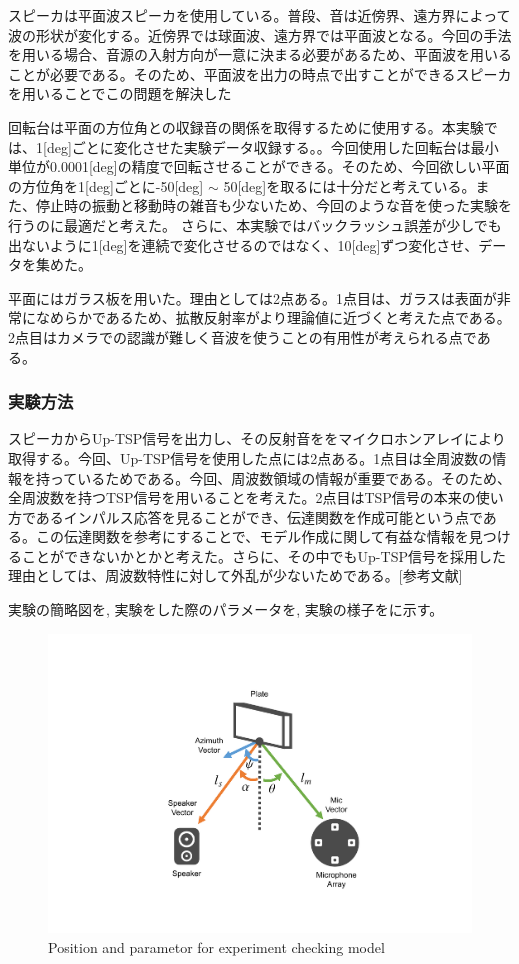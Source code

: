 スピーカは平面波スピーカを使用している。普段、音は近傍界、遠方界によって波の形状が変化する。近傍界では球面波、遠方界では平面波となる。今回の手法を用いる場合、音源の入射方向が一意に決まる必要があるため、平面波を用いることが必要である。そのため、平面波を出力の時点で出すことができるスピーカを用いることでこの問題を解決した

回転台は平面の方位角との収録音の関係を取得するために使用する。本実験では、1[deg]ごとに変化させた実験データ収録する。。今回使用した回転台は最小単位が0.0001[deg]の精度で回転させることができる。そのため、今回欲しい平面の方位角を1[deg]ごとに-50[deg] $\sim$ 50[deg]を取るには十分だと考えている。また、停止時の振動と移動時の雑音も少ないため、今回のような音を使った実験を行うのに最適だと考えた。
さらに、本実験ではバックラッシュ誤差が少しでも出ないように1[deg]を連続で変化させるのではなく、10[deg]ずつ変化させ、データを集めた。

平面にはガラス板を用いた。理由としては2点ある。1点目は、ガラスは表面が非常になめらかであるため、拡散反射率がより理論値に近づくと考えた点である。2点目はカメラでの認識が難しく音波を使うことの有用性が考えられる点である。


\subsubsection{実験方法}
スピーカからUp-TSP信号を出力し、その反射音ををマイクロホンアレイにより取得する。今回、Up-TSP信号を使用した点には2点ある。1点目は全周波数の情報を持っているためである。今回、周波数領域の情報が重要である。そのため、全周波数を持つTSP信号を用いることを考えた。2点目はTSP信号の本来の使い方であるインパルス応答を見ることができ、伝達関数を作成可能という点である。この伝達関数を参考にすることで、モデル作成に関して有益な情報を見つけることができないかとかと考えた。さらに、その中でもUp-TSP信号を採用した理由としては、周波数特性に対して外乱が少ないためである。[参考文献]

実験の簡略図を, 実験をした際のパラメータを, 
実験の様子をに示す。

\begin{figure}[ht]
  \begin{center}
  \vspace{1zh}
    \includegraphics[width=0.55\linewidth]{images/3_exp_pos_para.pdf}  
  \end{center}
  \caption{Position and parametor for experiment checking model}
  \label{fig:exp_pos_para}
\end{figure}

